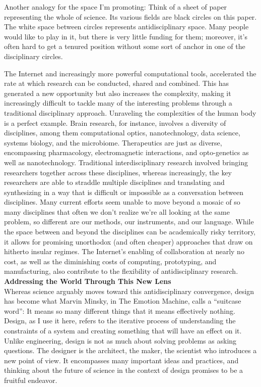 Another analogy for the space I'm promoting: Think of a sheet of paper representing the whole of science. Its various fields are black circles on this paper. The white space between circles represents antidisciplinary space. Many people would like to play in it, but there is very little funding for them; moreover, it's often hard to get a tenured position without some sort of anchor in one of the disciplinary circles. 

The Internet and increasingly more powerful computational tools, accelerated the rate at which research can be conducted, shared and combined. This has generated a new opportunity but also increases the complexity, making it increasingly difficult to tackle many of the interesting problems through a traditional disciplinary approach. Unraveling the complexities of the human body is a perfect example. Brain research, for instance, involves a diversity of disciplines, among them computational optics, nanotechnology, data science, systems biology, and the microbiome. Therapeutics are just as diverse, encompassing pharmacology, electromagnetic interactions, and opto-genetics as well as nanotechnology. Traditional interdisciplinary research involved bringing researchers together across these disciplines, whereas increasingly, the key researchers are able to straddle multiple disciplines and translating and synthesizing in a way that is difficult or impossible as a conversation between disciplines. Many current efforts seem unable to move beyond a mosaic of so many disciplines that often we don't realize we're all looking at the same problem, so different are our methods, our instruments, and our language. 
While the space between and beyond the disciplines can be academically risky territory, it allows for promising unorthodox (and often cheaper) approaches that draw on hitherto insular regimes. The Internet's enabling of collaboration at nearly no cost, as well as the diminishing costs of computing, prototyping, and manufacturing, also contribute to the flexibility of antidisciplinary research. \\ 

\textbf{Addressing the World Through This New Lens} \\

Whereas science arguably moves toward this antidisciplinary convergence, design has become what Marvin Minsky, in The Emotion Machine, calls a ``suitcase word'': It means so many different things that it means effectively nothing. Design, as I use it here, refers to the iterative process of understanding the constraints of a system and creating something that will have an effect on it. Unlike engineering, design is not as much about solving problems as asking questions. The designer is the architect, the maker, the scientist who introduces a new point of view. It encompasses many important ideas and practices, and thinking about the future of science in the context of design promises to be a fruitful endeavor.


